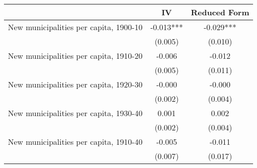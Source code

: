  \begin{tabular}{l*{2}{c}} \toprule
                &\multicolumn{1}{c}{IV}&\multicolumn{1}{c}{Reduced Form}\\
\midrule
New municipalities per capita, 1900-10&   -0.013***&   -0.029***\\
                &  (0.005)   &  (0.010)   \\
\addlinespace
New municipalities per capita, 1910-20&   -0.006   &   -0.012   \\
                &  (0.005)   &  (0.011)   \\
\addlinespace
New municipalities per capita, 1920-30&   -0.000   &   -0.000   \\
                &  (0.002)   &  (0.004)   \\
\addlinespace
New municipalities per capita, 1930-40&    0.001   &    0.002   \\
                &  (0.002)   &  (0.004)   \\
\addlinespace
New municipalities per capita, 1910-40&   -0.005   &   -0.011   \\
                &  (0.007)   &  (0.017)   \\
 \bottomrule \end{tabular}
